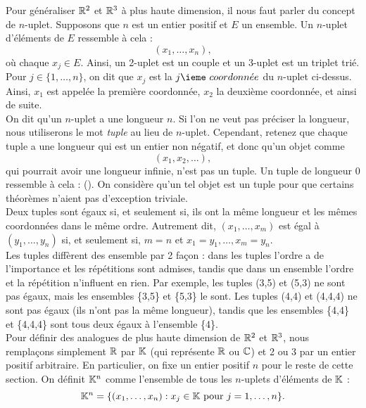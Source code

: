 \documentclass[12pt]{book}
\theoremstyle{plain}
\begin{document}
Pour généraliser $\mathbb{R}^2$ et $\mathbb{R}^3$ à plus haute dimension, il nous faut parler du concept de $n$-uplet. Supposons que $n$ est un entier positif et $E$ un ensemble. Un $n$-uplet d'éléments de $E$ ressemble à cela :
\begin{equation*}
    (x_1,\ldots,x_n)\mathrm{,}
\end{equation*}
o\`u chaque $x_j \in E$. Ainsi, un 2-uplet est un couple et un 3-uplet est un triplet trié. Pour $j\in\{1,\ldots,n\}$, on dit que $x_j$ est la $j\ieme ~coordonn\Acute{e}e$ du $n$-uplet ci-dessus. Ainsi, $x_1$ est appelée la première coordonnée, $x_2$ la deuxième coordonnée, et ainsi de suite.\\
\indent
On dit qu'un $n$-uplet a une longueur $n$. Si l'on ne veut pas préciser la longueur, nous utiliserons le mot \textit{tuple} au lieu de $n$-uplet. Cependant, retenez que chaque tuple a une longueur qui est un entier non négatif, et donc qu'un objet comme
\begin{equation*}
    (x_1,x_2,\ldots)\mathrm{,}
\end{equation*}
qui pourrait avoir une longueur infinie, n'est pas un tuple. Un tuple de longueur 0 ressemble à cela : (). On considère qu'un tel objet est un tuple pour que certains théorèmes n'aient pas d'exception triviale.\\
\indent
Deux tuples sont égaux si, et seulement si, ils ont la même longueur et les mêmes coordonnées dans le même ordre. Autrement dit, $(x_1,\ldots,x_m)$ est égal à $(y_1,\ldots,y_n)$ si, et seulement si, $m=n$ et $x_1=y_1,\ldots,x_m=y_n$.\\
\indent
Les tuples diffèrent des ensemble par 2 fa\c con : dans les tuples l'ordre a de l'importance et les répétitions sont admises, tandis que dans un ensemble l'ordre et la répétition n'influent en rien. Par exemple, les tuples (3,5) et (5,3) ne sont pas égaux, mais les ensembles \{3,5\} et \{5,3\} le sont. Les tuples (4,4) et (4,4,4) ne sont pas égaux (ils n'ont pas la même longueur), tandis que les ensembles \{4,4\} et \{4,4,4\} sont tous deux égaux à l'ensemble \{4\}.\\

\pagebreak
\indent
Pour définir des analogues de plus haute dimension de $\mathbb{R}^2$ et $\mathbb{R}^3$, nous remplaçons simplement $\mathbb{R}$ par $\mathbb{K}$ (qui représente $\mathbb{R}$ ou $\mathbb{C}$) et 2 ou 3 par un entier positif arbitraire. En particulier, on fixe un entier positif $n$ pour le reste de cette section. On définit $\mathbb{K}^n$ comme l'ensemble de tous les $n$-uplets d'éléments de $\mathbb{K}$ :
\begin{equation*}
    \mathbb{K}^n = \{(x_1,\ldots,x_n):x_j\in\mathbb{K} \mathrm{~pour~} j=1,\ldots,n\}\mathrm{.}
\end{equation*}
\end{document}
